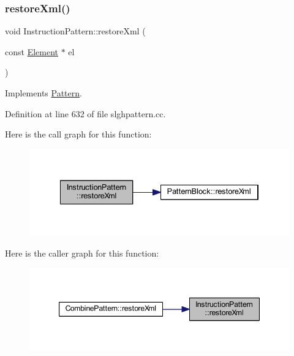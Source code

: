 \subsubsection{\texorpdfstring{restoreXml()}{restoreXml()}}
{\footnotesize\ttfamily void Instruction\+Pattern\+::restore\+Xml (\begin{DoxyParamCaption}\item[{const \mbox{\hyperlink{class_element}{Element}} $\ast$}]{el }\end{DoxyParamCaption})\hspace{0.3cm}{\ttfamily [virtual]}}



Implements \mbox{\hyperlink{class_pattern_aaa8fb2873854fb42d944fa8876102bb5}{Pattern}}.



Definition at line 632 of file slghpattern.\+cc.

Here is the call graph for this function\+:
\nopagebreak
\begin{figure}[H]
\begin{center}
\leavevmode
\includegraphics[width=334pt]{class_instruction_pattern_adeb7cb99c731f21b58f201972d923ac8_cgraph}
\end{center}
\end{figure}
Here is the caller graph for this function\+:
\nopagebreak
\begin{figure}[H]
\begin{center}
\leavevmode
\includegraphics[width=347pt]{class_instruction_pattern_adeb7cb99c731f21b58f201972d923ac8_icgraph}
\end{center}
\end{figure}
\mbox{\label{class_instruction_pattern_a355f6e3868e5d1e43b324bdad38e27ed}} 
